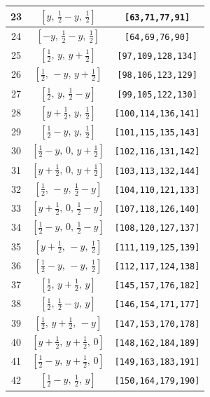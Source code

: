 \documentclass[fleqn,8pt]{jsarticle}
\begin{document}
\begin{longtable}{ccc}
23 & $\left[ y,\, \frac{1}{2} - y,\, \frac{1}{2} \right]$ & {\tt [63,71,77,91]} \\ \hline
24 & $\left[ - y,\, \frac{1}{2} - y,\, \frac{1}{2} \right]$ & {\tt [64,69,76,90]} \\ \hline
25 & $\left[ \frac{1}{2},\, y,\, y + \frac{1}{2} \right]$ & {\tt [97,109,128,134]} \\ \hline
26 & $\left[ \frac{1}{2},\, - y,\, y + \frac{1}{2} \right]$ & {\tt [98,106,123,129]} \\ \hline
27 & $\left[ \frac{1}{2},\, y,\, \frac{1}{2} - y \right]$ & {\tt [99,105,122,130]} \\ \hline
28 & $\left[ y + \frac{1}{2},\, y,\, \frac{1}{2} \right]$ & {\tt [100,114,136,141]} \\ \hline
29 & $\left[ \frac{1}{2} - y,\, y,\, \frac{1}{2} \right]$ & {\tt [101,115,135,143]} \\ \hline
30 & $\left[ \frac{1}{2} - y,\, 0,\, y + \frac{1}{2} \right]$ & {\tt [102,116,131,142]} \\ \hline
31 & $\left[ y + \frac{1}{2},\, 0,\, y + \frac{1}{2} \right]$ & {\tt [103,113,132,144]} \\ \hline
32 & $\left[ \frac{1}{2},\, - y,\, \frac{1}{2} - y \right]$ & {\tt [104,110,121,133]} \\ \hline
33 & $\left[ y + \frac{1}{2},\, 0,\, \frac{1}{2} - y \right]$ & {\tt [107,118,126,140]} \\ \hline
34 & $\left[ \frac{1}{2} - y,\, 0,\, \frac{1}{2} - y \right]$ & {\tt [108,120,127,137]} \\ \hline
35 & $\left[ y + \frac{1}{2},\, - y,\, \frac{1}{2} \right]$ & {\tt [111,119,125,139]} \\ \hline
36 & $\left[ \frac{1}{2} - y,\, - y,\, \frac{1}{2} \right]$ & {\tt [112,117,124,138]} \\ \hline
37 & $\left[ \frac{1}{2},\, y + \frac{1}{2},\, y \right]$ & {\tt [145,157,176,182]} \\ \hline
38 & $\left[ \frac{1}{2},\, \frac{1}{2} - y,\, y \right]$ & {\tt [146,154,171,177]} \\ \hline
39 & $\left[ \frac{1}{2},\, y + \frac{1}{2},\, - y \right]$ & {\tt [147,153,170,178]} \\ \hline
40 & $\left[ y + \frac{1}{2},\, y + \frac{1}{2},\, 0 \right]$ & {\tt [148,162,184,189]} \\ \hline
41 & $\left[ \frac{1}{2} - y,\, y + \frac{1}{2},\, 0 \right]$ & {\tt [149,163,183,191]} \\ \hline
42 & $\left[ \frac{1}{2} - y,\, \frac{1}{2},\, y \right]$ & {\tt [150,164,179,190]} \\ \hline

\end{longtable}
\end{document}
